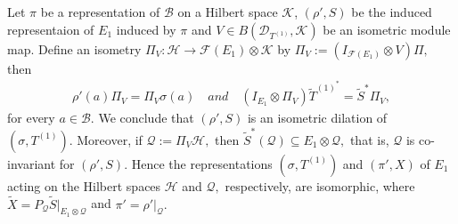 \documentclass[12pt]{amsart}
\numberwithin{equation}{section}
\theoremstyle{plain}
\newcommand{\ot}{\otimes}
\newcommand{\wt}{\widetilde}
\newcommand{\wT}{\wt{T}}
\begin{document}
Let $\pi$ be a representation of $\mathcal{B}$ on a Hilbert space $\mathcal{K}$, $(\rho', S )$ be the induced representaion of $E_1$ induced by $\pi$ and $V\in B({\mathcal{D}_{ {T^{(1)}}}},\mathcal{K})$ be an isometric module map. Define an isometry $\Pi_V: \mathcal{H} \longrightarrow \mathcal{F}(E_1)\otimes\mathcal{K}$  by
$\Pi_V:=(I_{\mathcal{F}(E_1)}\ot V)\Pi,$ then
\begin{align*} \rho'(a)\Pi_V=\Pi_V \sigma(a)    \quad and \quad  (I_{E_1}\ot \Pi_V)\wT^{(1)^*} =\widetilde{S}^{*}\Pi_V,
\end{align*}  for every $a\in \mathcal{B}.$ We conclude that $(\rho', S)$ is an isometric dilation of $(\sigma,T^{(1)}).$ Moreover, if $\mathcal{Q}:=\Pi_V\mathcal{H},$ then $\widetilde{S}^{*}(\mathcal{Q})\subseteq E_1\ot \mathcal{Q},$ that is, $\mathcal{Q}$ is co-invariant for $(\rho',S).$ Hence the representations $(\sigma, T^{(1)})$ and $(\pi',X)$ of ${E_1}$ acting on the Hilbert spaces $\mathcal{H}$ and $\mathcal{Q},$ respectively, are isomorphic, where
$\widetilde{X}= P_{\mathcal{Q}}\widetilde{S}|_{E_1\ot \mathcal{Q}}$ and $\pi'=\rho'|_{\mathcal{Q}}.$ 
 
\end{document}
